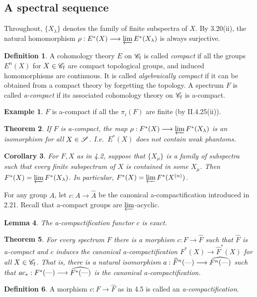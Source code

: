 \documentclass[11pt]{article}
\renewcommand{\comment}{}
\theoremstyle{plain}
\newtheorem{thm}{Theorem}[subsection]
\newtheorem{lem}[thm]{Lemma}
\newtheorem{cor}[thm]{Corollary}
\theoremstyle{definition}
\newtheorem{defn}[thm]{Definition}
\newtheorem*{exmp*}{Example}
\newcommand{\Specf}{\scrC_\textup{f}}
\begin{document}
\subsection{A spectral sequence}
\comment{
Throughout, $\{X_\lambda\}$ denotes the family of finite subspectra of $X$. By
3.20(ii), the natural homomorphism $\rho:E^*(X)\to\varprojlim E^*(X_\lambda)$ is
always surjective.
\begin{defn}
A cohomology theory $E$ on $\Specf$ is called \emph{compact} if all the groups
$E^n(X)$ for $X\in\Specf$ are compact topological groups, and induced
homomorphisms are continuous. It is called \emph{algebraically compact} if it
can be obtained from a compact theory by forgetting the topology. A spectrum $F$
is called \emph{a-compact} if its associated cohomology theory on $\Specf$ is
a-compact.
\end{defn}
\begin{exmp*}
$F$ is a-compact if all the $\pi_i(F)$ are finite (by II.4.25(ii)).
\end{exmp*}
\begin{thm}
If $F$ is a-compact, the map $\rho:F^*(X)\to\varprojlim F^*(X_\lambda)$ is an
isomorphism for all $X\in\scrS$. I.e.\ $E^*(X)$ does not contain weak phantoms.
\end{thm}
\begin{cor}
For $F,X$ as in 4.2, suppose that $\{X_\mu\}$ is a family of subspectra such
that every finite subspectrum of $X$ is contained in some $X_\mu$. Then
$F^*(X)=\varprojlim F^*(X_\lambda)$. In particular, $F^*(X)=\varprojlim
F^*(X^{(n)})$.
\end{cor}
For any group $A$, let $c:A\to\widehat A$ be the canonical a-compactification
introduced in 2.21. Recall that a-compact groups are $\varprojlim$-acyclic.
\begin{lem}
The a-compactification functor $c$ is exact.
\end{lem}
\begin{thm}
For every spectrum $F$ there is a morphism $c:F\to\widehat F$ such that
$\widehat F$ is a-compact and $c$ induces the canonical a-compactification
$F^*(X)\to \widehat F^*(X)$ for all $X\in\Specf$. \lparen That is, there is a
natural isomorphism $a:\widehat F^n(\DASH)\to\widehat{F^n(\DASH)}$ such that
$ac_*:F^*(\DASH)\to\widehat{F^*(\DASH)}$ is the canonical
a-compactification\rparen.
\end{thm}
\setcounter{thm}{6}
\begin{defn}
A morphism $c:F\to\widehat F$ as in 4.5 is called an \emph{a-compactification}.
\end{defn}
}
\end{document}
